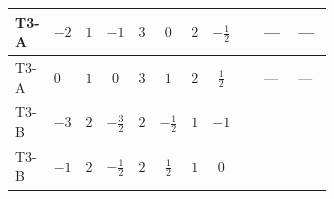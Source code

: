 \documentclass[8pt]{article}
\begin{document}
\begin{landscape}
\begin{longtable}{@{}llcccccc >{\raggedright\arraybackslash}p{0.21\linewidth} >{\raggedright\arraybackslash}p{0.21\linewidth} >{\raggedright\arraybackslash}p{0.21\linewidth}@{}}
\midrule
T3-A & $-2$ & $1$ & $-1$ & $3$ & $0$ & $2$ & $-\frac{1}{2}$ & \scriptsize\adjustbox{max width=\linewidth}{$\begin{gathered} +4 {\lambda_{HS_1}^{(1)}} {\lambda_{S_1}^{(1)}}\end{gathered}$} & --- & --- \\
\midrule
T3-A & $0$ & $1$ & $0$ & $3$ & $1$ & $2$ & $\frac{1}{2}$ & \scriptsize\adjustbox{max width=\linewidth}{$\begin{gathered} +4 {\lambda_{HS_1}^{(1)}} {\lambda_{S_1}^{(1)}}\end{gathered}$} & --- & --- \\
\midrule
T3-B & $-3$ & $2$ & $-\frac{3}{2}$ & $2$ & $-\frac{1}{2}$ & $1$ & $-1$ & \scriptsize\adjustbox{max width=\linewidth}{$\begin{gathered} +6 {\lambda_{HS_1}^{(1)}} {\lambda_{S_1}^{(1)}}\end{gathered}$} & \scriptsize\adjustbox{max width=\linewidth}{$\begin{gathered} {\lambda_{HS_1}^{(1)}} (2 T_{\nu}^{(1)}+6 \operatorname{Tr}\!\left({Y_d}\,\left({Y_d}\right)^{\dagger}\right)+2 \operatorname{Tr}\!\left({Y_e}\,\left({Y_e}\right)^{\dagger}\right)+6 \operatorname{Tr}\!\left({Y_u}\,\left({Y_u}\right)^{\dagger}\right))\end{gathered}$} & \scriptsize\adjustbox{max width=\linewidth}{$\begin{gathered} +\frac{9 {g_2}^4}{4}\end{gathered}$} \\
\midrule
T3-B & $-1$ & $2$ & $-\frac{1}{2}$ & $2$ & $\frac{1}{2}$ & $1$ & $0$ & \scriptsize\adjustbox{max width=\linewidth}{$\begin{gathered} +6 {\lambda_{HS_1}^{(1)}} {\lambda_{S_1}^{(1)}}\end{gathered}$} & \scriptsize\adjustbox{max width=\linewidth}{$\begin{gathered} {\lambda_{HS_1}^{(1)}} (2 T_{\nu}^{(1)}+6 \operatorname{Tr}\!\left({Y_d}\,\left({Y_d}\right)^{\dagger}\right)+2 \operatorname{Tr}\!\left({Y_e}\,\left({Y_e}\right)^{\dagger}\right)+6 \operatorname{Tr}\!\left({Y_u}\,\left({Y_u}\right)^{\dagger}\right))\end{gathered}$} & \scriptsize\adjustbox{max width=\linewidth}{$\begin{gathered} +\frac{9 {g_2}^4}{4}\end{gathered}$} \\
\midrule

\end{longtable}
\end{landscape}
\end{document}
